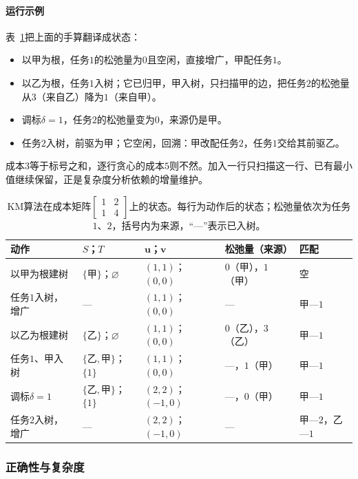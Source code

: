 \paragraph{运行示例}
表~\ref{tab:graph-opt-hungarian-trace}把上面的手算翻译成状态：
\begin{itemize}
  \item 以甲为根，任务$1$的松弛量为$0$且空闲，直接增广，甲配任务$1$。
  \item 以乙为根，任务$1$入树；它已归甲，甲入树，只扫描甲的边，把任务$2$的松弛量从$3$（来自乙）降为$1$（来自甲）。
  \item 调标$\delta=1$，任务$2$的松弛量变为$0$，来源仍是甲。
  \item 任务$2$入树，前驱为甲；它空闲，回溯：甲改配任务$2$，任务$1$交给其前驱乙。
\end{itemize}
成本$3$等于标号之和，逐行贪心的成本$5$则不然。加入一行只扫描这一行、已有最小值继续保留，正是复杂度分析依赖的增量维护。

\begin{table}[!htb]
  \centering\small
  \begin{tabular}{@{}lllll@{}}
    \toprule
    动作 & $S$；$T$ & $\bm u$；$\bm v$ & 松弛量（来源） & 匹配 \\
    \midrule
    以甲为根建树 & $\{\text{甲}\}$；$\varnothing$ & $(1,1)$；$(0,0)$ & $0$（甲），$1$（甲） & 空 \\
    任务$1$入树，增广 & — & $(1,1)$；$(0,0)$ & — & 甲—$1$ \\
    以乙为根建树 & $\{\text{乙}\}$；$\varnothing$ & $(1,1)$；$(0,0)$ & $0$（乙），$3$（乙） & 甲—$1$ \\
    任务$1$、甲入树 & $\{\text{乙},\text{甲}\}$；$\{1\}$ & $(1,1)$；$(0,0)$ & —，$1$（甲） & 甲—$1$ \\
    调标$\delta=1$ & $\{\text{乙},\text{甲}\}$；$\{1\}$ & $(2,2)$；$(-1,0)$ & —，$0$（甲） & 甲—$1$ \\
    任务$2$入树，增广 & — & $(2,2)$；$(-1,0)$ & — & 甲—$2$，乙—$1$ \\
    \bottomrule
  \end{tabular}
  \caption{KM算法在成本矩阵$\left[\begin{smallmatrix}1&2\\1&4\end{smallmatrix}\right]$上的状态。每行为动作后的状态；松弛量依次为任务$1$、$2$，括号内为来源，“—”表示已入树。}
  \label{tab:graph-opt-hungarian-trace}
\end{table}

\subsubsection{正确性与复杂度}

